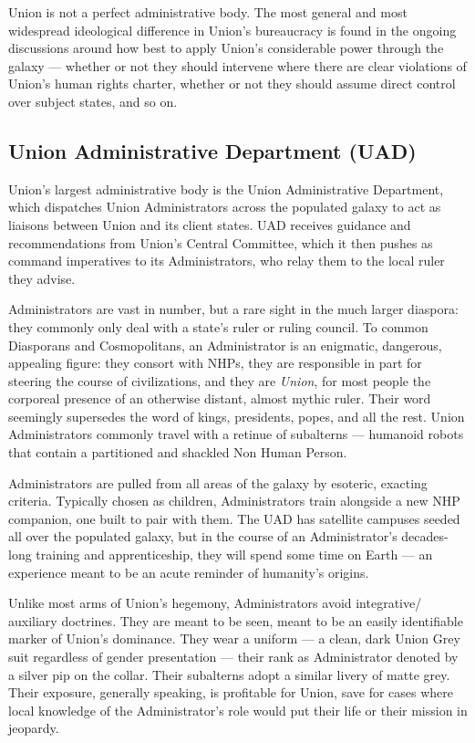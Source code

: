 Union is not a perfect administrative body. The most general and most widespread ideological
difference in Union's bureaucracy is found in the ongoing discussions around how best to apply
Union's considerable power through the galaxy — whether or not they should intervene where
there are clear violations of Union's human rights charter, whether or not they should assume
direct control over subject states, and so on.

\subsection{Union Administrative Department (UAD)}

Union's largest administrative body is the Union Administrative Department, which dispatches
Union Administrators across the populated galaxy to act as liaisons between Union and its client
states. UAD receives guidance and recommendations from Union's Central Committee, which it
then pushes as command imperatives to its Administrators, who relay them to the local ruler they
advise.

Administrators are vast in number, but a rare sight in the much larger diaspora: they commonly
only deal with a state's ruler or ruling council. To common Diasporans and Cosmopolitans, an
Administrator is an enigmatic, dangerous, appealing figure: they consort with NHPs, they are
responsible in part for steering the course of civilizations, and they are \textit{Union}, for most people
the corporeal presence of an otherwise distant, almost mythic ruler. Their word seemingly
supersedes the word of kings, presidents, popes, and all the rest. Union Administrators
commonly travel with a retinue of subalterns — humanoid robots that contain a partitioned and
shackled Non Human Person.

Administrators are pulled from all areas of the galaxy by esoteric, exacting criteria. Typically
chosen as children, Administrators train alongside a new NHP companion, one built to pair with
them. The UAD has satellite campuses seeded all over the populated galaxy, but in the course of
an Administrator's decades-long training and apprenticeship, they will spend some time on Earth
— an experience meant to be an acute reminder of humanity's origins.

Unlike most arms of Union's hegemony, Administrators avoid integrative/ auxiliary doctrines.
They are meant to be seen, meant to be an easily identifiable marker of Union's dominance. They
wear a uniform — a clean, dark Union Grey suit regardless of gender presentation — their rank
as Administrator denoted by a silver pip on the collar. Their subalterns adopt a similar livery of
matte grey. Their exposure, generally speaking, is profitable for Union, save for cases where local
knowledge of the Administrator's role would put their life or their mission in jeopardy.

